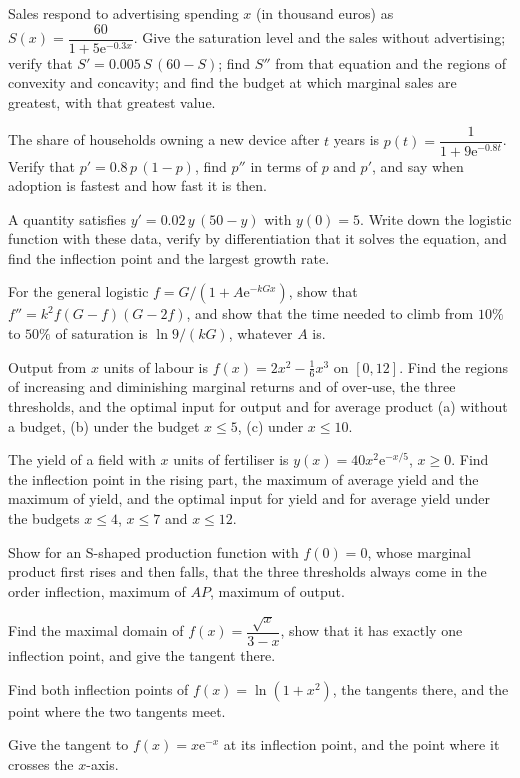 \begin{problems}[resume]
  \item Sales respond to advertising spending $x$ (in thousand euros) as
        $S(x)=\dfrac{60}{1+5\mathrm{e}^{-0.3x}}$. Give the saturation level
        and the sales without advertising; verify that
        $S'=0.005\,S\,(60-S)$; find $S''$ from that equation and the
        regions of convexity and concavity; and find the budget at which
        marginal sales are greatest, with that greatest value.
  \item The share of households owning a new device after $t$ years is
        $p(t)=\dfrac{1}{1+9\mathrm{e}^{-0.8t}}$. Verify that
        $p'=0.8\,p\,(1-p)$, find $p''$ in terms of $p$ and $p'$, and say
        when adoption is fastest and how fast it is then.
  \item A quantity satisfies $y'=0.02\,y\,(50-y)$ with $y(0)=5$. Write
        down the logistic function with these data, verify by
        differentiation that it solves the equation, and find the
        inflection point and the largest growth rate.
  \item For the general logistic $f=G/(1+A\mathrm{e}^{-kGx})$, show that
        $f''=k^{2}f(G-f)(G-2f)$, and show that the time needed to climb
        from $10\%$ to $50\%$ of saturation is $\ln9/(kG)$, whatever $A$
        is.
  \item Output from $x$ units of labour is $f(x)=2x^{2}-\tfrac16x^{3}$ on
        $[0,12]$. Find the regions of increasing and diminishing marginal
        returns and of over-use, the three thresholds, and the optimal
        input for output and for average product (a) without a budget,
        (b) under the budget $x\le5$, (c) under $x\le10$.
  \item The yield of a field with $x$ units of fertiliser is
        $y(x)=40x^{2}\mathrm{e}^{-x/5}$, $x\ge0$. Find the inflection point
        in the rising part, the maximum of average yield and the maximum
        of yield, and the optimal input for yield and for average yield
        under the budgets $x\le4$, $x\le7$ and $x\le12$.
  \item Show for an S-shaped production function with $f(0)=0$, whose
        marginal product first rises and then falls, that the three
        thresholds always come in the order inflection, maximum of $AP$,
        maximum of output.
  \item Find the maximal domain of $f(x)=\dfrac{\sqrt{x}}{3-x}$, show that
        it has exactly one inflection point, and give the tangent there.
  \item Find both inflection points of $f(x)=\ln(1+x^{2})$, the tangents
        there, and the point where the two tangents meet.
  \item Give the tangent to $f(x)=x\mathrm{e}^{-x}$ at its inflection
        point, and the point where it crosses the $x$-axis.
\end{problems}

